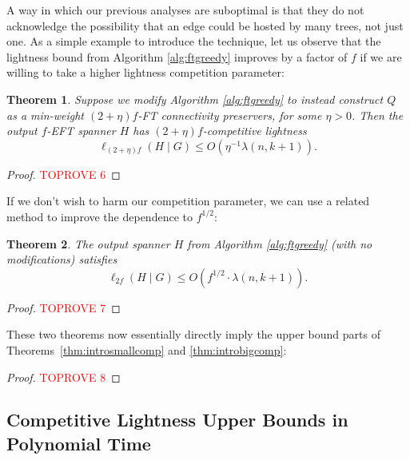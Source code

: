 \documentclass{article}
\newif\ifshort
\theoremstyle{plain}
\newtheorem{theorem}{Theorem}
\theoremstyle{definition}
\begin{document}
A way in which our previous analyses are suboptimal is that they do not acknowledge the possibility that an edge could be hosted by many trees, not just one.
As a simple example to introduce the technique, let us observe that the lightness bound from Algorithm \ref{alg:ftgreedy} improves by a factor of $f$ if we are willing to take a higher lightness competition parameter:
\begin{theorem} \label{thm:high-parameter-lightness}
Suppose we modify Algorithm \ref{alg:ftgreedy} to instead construct $Q$ as a min-weight $(2+\eta)f$-FT connectivity preservers, for some $\eta >0$.
Then the output $f$-EFT spanner $H$ has $(2+\eta)f$-competitive lightness
$$ \ell_{(2+\eta)f}(H \mid G) \le O\left( \eta^{-1} \lambda(n, k+1)\right).$$
\end{theorem}
\begin{proof}\textcolor{red}{TOPROVE 6}\end{proof}

If we don't wish to harm our competition parameter, we can use a related method to improve the dependence to $f^{1/2}$:
\begin{theorem} \label{thm:warmupgoodf}
The output spanner $H$ from Algorithm \ref{alg:ftgreedy} (with no modifications) satisfies
$$\ell_{2f}(H \mid G) \le O\left( f^{1/2} \cdot \lambda(n, k+1) \right).$$
\end{theorem}
\begin{proof}\textcolor{red}{TOPROVE 7}\end{proof}

These two theorems now essentially directly imply the upper bound parts of Theorems~\ref{thm:introsmallcomp} and \ref{thm:introbigcomp}:

\begin{proof}\textcolor{red}{TOPROVE 8}\end{proof}

\ifshort
\else
\subsection{Competitive Lightness Upper Bounds in Polynomial Time} \label{sec:polytime}
\end{document}

